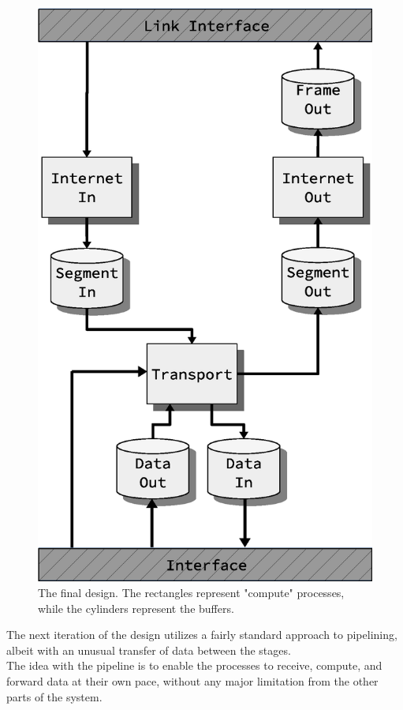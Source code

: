 \begin{figure}
    \includegraphics[width=\linewidth]{design/design_2.eps}
    \caption{The final design. The rectangles represent "compute" processes,
while the cylinders represent the buffers.}
    \label{fig:final_design}
\end{figure}

The next iteration of the design utilizes a fairly standard approach to
pipelining, albeit with an unusual transfer of data between the stages.\\
The idea with the pipeline is to enable the processes to receive, compute, and
forward data at their own pace, without any major limitation from the other
parts of the system.

